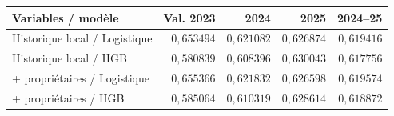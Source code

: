\begin{tabularx}{\linewidth}{@{}Xrrrr@{}}
\toprule
Variables / modèle & Val. 2023 & 2024 & 2025 & 2024--25 \\
\midrule
Historique local / Logistique & $0{,}653494$ & $0{,}621082$ & $0{,}626874$ & $0{,}619416$ \\
Historique local / HGB & $0{,}580839$ & $0{,}608396$ & $0{,}630043$ & $0{,}617756$ \\
+ propriétaires / Logistique & $0{,}655366$ & $0{,}621832$ & $0{,}626598$ & $0{,}619574$ \\
+ propriétaires / HGB & $0{,}585064$ & $0{,}610319$ & $0{,}628614$ & $0{,}618872$ \\
\bottomrule
\end{tabularx}
